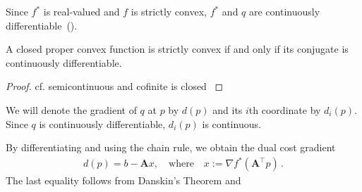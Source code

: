 Since $f^*$ is real-valued and $f$ is strictly convex, 
$f^*$ and $q$ are continuously differentiable~().
\begin{theorem*}
  A closed proper convex function is strictly convex
  if and only if its conjugate is continuously differentiable.
\end{theorem*}
\begin{proof}
  cf.\cite[Theorem~26.3]{Rockafellar1970}
semicontinuous and cofinite is closed
\cite[Proposition~1.1.3]{Bertsekas2009}
\end{proof}

We will denote the gradient of $q$ at $p$ by $d(p)$
and its $i$th coordinate by $d_i(p).$
Since $q$ is continuously differentiable, $d_i(p)$ is continuous.

By differentiating and using the chain rule, 
we obtain the dual cost gradient
\begin{gather}
  \label{cv:ts:1}
  d(p)=b-\mathbf{A}x,
  \quad
  \text{where}
  \quad
  x:=
  \nabla
  f^*
  (
    \mathbf{A}^\top
    p
  )
  \,.
\end{gather}
The last equality follows from Danskin's Theorem and \cite[Theorem~23.5]{Rockafellar1970}


